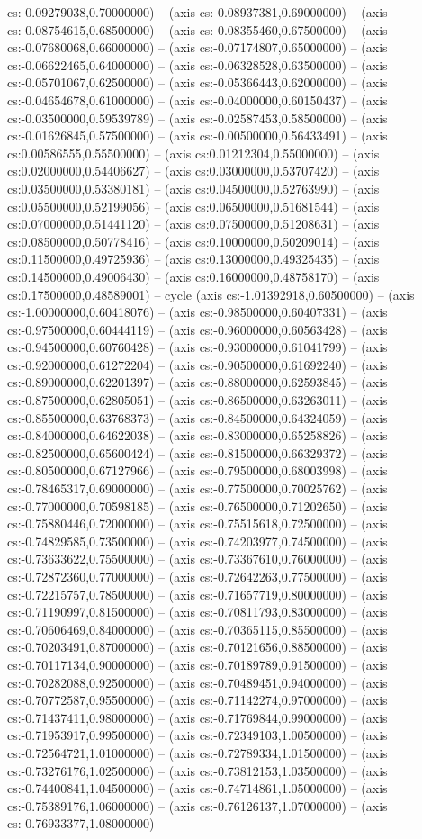cs:-0.09279038,0.70000000) -- (axis cs:-0.08937381,0.69000000) -- (axis cs:-0.08754615,0.68500000) -- (axis cs:-0.08355460,0.67500000) -- (axis cs:-0.07680068,0.66000000) -- (axis cs:-0.07174807,0.65000000) -- (axis cs:-0.06622465,0.64000000) -- (axis cs:-0.06328528,0.63500000) -- (axis cs:-0.05701067,0.62500000) -- (axis cs:-0.05366443,0.62000000) -- (axis cs:-0.04654678,0.61000000) -- (axis cs:-0.04000000,0.60150437) -- (axis cs:-0.03500000,0.59539789) -- (axis cs:-0.02587453,0.58500000) -- (axis cs:-0.01626845,0.57500000) -- (axis cs:-0.00500000,0.56433491) -- (axis cs:0.00586555,0.55500000) -- (axis cs:0.01212304,0.55000000) -- (axis cs:0.02000000,0.54406627) -- (axis cs:0.03000000,0.53707420) -- (axis cs:0.03500000,0.53380181) -- (axis cs:0.04500000,0.52763990) -- (axis cs:0.05500000,0.52199056) -- (axis cs:0.06500000,0.51681544) -- (axis cs:0.07000000,0.51441120) -- (axis cs:0.07500000,0.51208631) -- (axis cs:0.08500000,0.50778416) -- (axis cs:0.10000000,0.50209014) -- (axis cs:0.11500000,0.49725936) -- (axis cs:0.13000000,0.49325435) -- (axis cs:0.14500000,0.49006430) -- (axis cs:0.16000000,0.48758170) -- (axis cs:0.17500000,0.48589001) -- cycle (axis cs:-1.01392918,0.60500000) -- (axis cs:-1.00000000,0.60418076) -- (axis cs:-0.98500000,0.60407331) -- (axis cs:-0.97500000,0.60444119) -- (axis cs:-0.96000000,0.60563428) -- (axis cs:-0.94500000,0.60760428) -- (axis cs:-0.93000000,0.61041799) -- (axis cs:-0.92000000,0.61272204) -- (axis cs:-0.90500000,0.61692240) -- (axis cs:-0.89000000,0.62201397) -- (axis cs:-0.88000000,0.62593845) -- (axis cs:-0.87500000,0.62805051) -- (axis cs:-0.86500000,0.63263011) -- (axis cs:-0.85500000,0.63768373) -- (axis cs:-0.84500000,0.64324059) -- (axis cs:-0.84000000,0.64622038) -- (axis cs:-0.83000000,0.65258826) -- (axis cs:-0.82500000,0.65600424) -- (axis cs:-0.81500000,0.66329372) -- (axis cs:-0.80500000,0.67127966) -- (axis cs:-0.79500000,0.68003998) -- (axis cs:-0.78465317,0.69000000) -- (axis cs:-0.77500000,0.70025762) -- (axis cs:-0.77000000,0.70598185) -- (axis cs:-0.76500000,0.71202650) -- (axis cs:-0.75880446,0.72000000) -- (axis cs:-0.75515618,0.72500000) -- (axis cs:-0.74829585,0.73500000) -- (axis cs:-0.74203977,0.74500000) -- (axis cs:-0.73633622,0.75500000) -- (axis cs:-0.73367610,0.76000000) -- (axis cs:-0.72872360,0.77000000) -- (axis cs:-0.72642263,0.77500000) -- (axis cs:-0.72215757,0.78500000) -- (axis cs:-0.71657719,0.80000000) -- (axis cs:-0.71190997,0.81500000) -- (axis cs:-0.70811793,0.83000000) -- (axis cs:-0.70606469,0.84000000) -- (axis cs:-0.70365115,0.85500000) -- (axis cs:-0.70203491,0.87000000) -- (axis cs:-0.70121656,0.88500000) -- (axis cs:-0.70117134,0.90000000) -- (axis cs:-0.70189789,0.91500000) -- (axis cs:-0.70282088,0.92500000) -- (axis cs:-0.70489451,0.94000000) -- (axis cs:-0.70772587,0.95500000) -- (axis cs:-0.71142274,0.97000000) -- (axis cs:-0.71437411,0.98000000) -- (axis cs:-0.71769844,0.99000000) -- (axis cs:-0.71953917,0.99500000) -- (axis cs:-0.72349103,1.00500000) -- (axis cs:-0.72564721,1.01000000) -- (axis cs:-0.72789334,1.01500000) -- (axis cs:-0.73276176,1.02500000) -- (axis cs:-0.73812153,1.03500000) -- (axis cs:-0.74400841,1.04500000) -- (axis cs:-0.74714861,1.05000000) -- (axis cs:-0.75389176,1.06000000) -- (axis cs:-0.76126137,1.07000000) -- (axis cs:-0.76933377,1.08000000) -- 